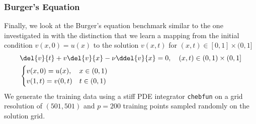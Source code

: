 \subsubsection{Burger's Equation}\label{subsec:Burgers_Experiments}
Finally, we look at the Burger's equation benchmark similar to the one investigated in \citet{li_fourier_2021} with the distinction that we learn a mapping from the initial condition $v(x, 0) = u(x)$ to the solution $v(x,t)$ for $(x,t)\in[0,1]\times (0,1]$
\begin{equation}
    \begin{aligned}
        & \del{v}{t}
        + v \del{v}{x}
        - 
        \nu \ddel{v}{x} = 0, \quad(x, t) \in(0,1) \times(0,1] \\
        & \begin{cases}
        v(x, 0)=u(x), \quad x \in(0,1) \\
        v(1, t) = v(0, t)\quad t \in (0,1)
        \end{cases}
    \end{aligned}
\label{eq:BurgersEquation_PDE}
\end{equation}
We generate the training data using a stiff PDE integrator \texttt{chebfun} \citet{driscoll2014chebfun} on a grid resolution of $(501, 501)$ and $p=200$ training points sampled randomly on the solution grid.


